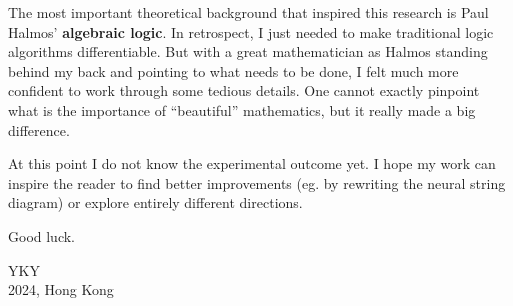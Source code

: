 \begin{preface}
The most important theoretical background that inspired this research is Paul Halmos' \textbf{algebraic logic}.  In retrospect, I just needed to make traditional logic algorithms differentiable.  But with a great mathematician as Halmos standing behind my back and pointing to what needs to be done, I felt much more confident to work through some tedious details.  One cannot exactly pinpoint what is the importance of ``beautiful'' mathematics, but it really made a big difference.

At this point I do not know the experimental outcome yet.  I hope my work can inspire the reader to find better improvements (eg. by rewriting the neural string diagram) or explore entirely different directions.

Good luck.

\begin{flushright}
YKY\\
2024, Hong Kong
\end{flushright}

\end{preface}
